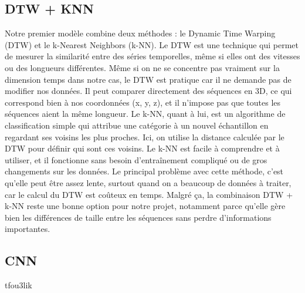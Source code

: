 \documentclass{article}
\begin{document}
\subsection{DTW + KNN}
Notre premier modèle combine deux méthodes : le Dynamic Time Warping (DTW) et le k-Nearest Neighbors (k-NN).
Le DTW est une technique qui permet de mesurer la similarité entre des séries temporelles, même si elles ont des vitesses ou des longueurs différentes. Même si on ne se concentre pas vraiment sur la dimension temps dans notre cas, le  DTW est pratique car il ne demande pas de modifier nos données. Il peut comparer directement des séquences en 3D, ce qui correspond bien à nos coordonnées (x, y, z), et il n’impose pas que toutes les séquences aient la même longueur.
Le k-NN, quant à lui, est un algorithme de classification simple qui attribue une catégorie à un nouvel échantillon en regardant ses voisins les plus proches. Ici, on utilise la distance calculée par le DTW pour définir qui sont ces voisins. Le k-NN est facile à comprendre et à utiliser, et il fonctionne sans besoin d’entraînement compliqué ou de gros changements sur les données.
Le principal problème avec cette méthode, c’est qu’elle peut être assez lente, surtout quand on a beaucoup de données à traiter, car le calcul du DTW est coûteux en temps.
Malgré ça, la combinaison DTW + k-NN reste une bonne option pour notre projet, notamment parce qu’elle gère bien les différences de taille entre les séquences sans perdre d’informations importantes. 

\subsection{CNN}
tfou3lik
\end{document}
